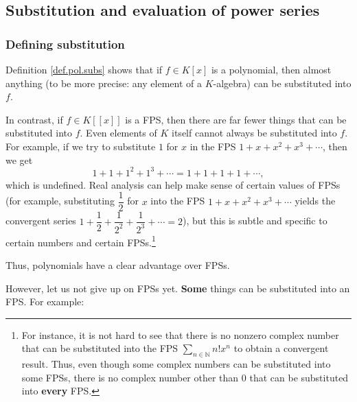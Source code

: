 \subsection{Substitution and evaluation of power series}

\subsubsection{Defining substitution}

Definition \ref{def.pol.subs} shows that if $f\in K\left[  x\right]  $ is a
polynomial, then almost anything (to be more precise: any element of a
$K$-algebra) can be substituted into $f$.

In contrast, if $f\in K\left[  \left[  x\right]  \right]  $ is a FPS, then
there are far fewer things that can be substituted into $f$. Even elements of
$K$ itself cannot always be substituted into $f$. For example, if we try to
substitute $1$ for $x$ in the FPS $1+x+x^{2}+x^{3}+\cdots$, then we get%
\[
1+1+1^{2}+1^{3}+\cdots=1+1+1+1+\cdots,
\]
which is undefined. Real analysis can help make sense of certain values of
FPSs (for example, substituting $\dfrac{1}{2}$ for $x$ into the FPS
$1+x+x^{2}+x^{3}+\cdots$ yields the convergent series $1+\dfrac{1}{2}%
+\dfrac{1}{2^{2}}+\dfrac{1}{2^{3}}+\cdots=2$), but this is subtle and specific
to certain numbers and certain FPSs.\footnote{For instance, it is not hard to
see that there is no nonzero complex number that can be substituted into the
FPS $\sum_{n\in\mathbb{N}}n!x^{n}$ to obtain a convergent result. Thus, even
though some complex numbers can be substituted into some FPSs, there is no
complex number other than $0$ that can be substituted into \textbf{every}
FPS.}

Thus, polynomials have a clear advantage over FPSs.

However, let us not give up on FPSs yet. \textbf{Some} things can be
substituted into an FPS. For example:

